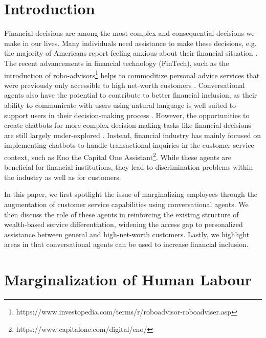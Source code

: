 \documentclass{sigchi-ext}
\begin{document}
\printccsdesc


\section{Introduction}

Financial decisions are among the most complex and consequential decisions we make in our lives. Many individuals need assistance to make these decisions, e.g. the majority of Americans report feeling anxious about their financial situation \cite{capitalone2020}. The recent advancements in financial technology (FinTech), such as the introduction of robo-advisors\footnote{https://www.investopedia.com/terms/r/roboadvisor-roboadviser.asp} helps to commoditize personal advice services that were previously only accessible to high net-worth customers \cite{philippon2019fintech}. Conversational agents also have the potential to contribute to better financial inclusion, as their ability to communicate with users using natural language is well suited to support users in their decision-making process \cite{volkel2021eliciting}. However, the opportunities to create chatbots for more complex decision-making tasks like financial decisions are still largely under-explored \cite{reicherts2022extending}. Instead, financial industry has mainly focused on implementing chatbots to handle transactional inquiries in the customer service context, such as Eno the Capital One Assistant\footnote{https://www.capitalone.com/digital/eno/}. While these agents are beneficial for financial institutions, they lead to discrimination problems within the industry as well as for customers.

In this paper, we first spotlight the issue of marginalizing employees through the augmentation of customer service capabilities using conversational agents. We then discuss the role of these agents in reinforcing the existing structure of wealth-based service differentiation, widening the access gap to personalized assistance between general and high-net-worth customers. Lastly, we highlight areas in that conversational agents can be used to increase financial inclusion.


\section{Marginalization of Human Labour}
\end{document}
